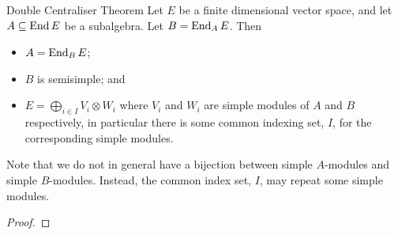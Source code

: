 \begin{thm}{Double Centraliser Theorem}{}
    Let \(E\) be a finite dimensional vector space, and let \(A \subseteq \operatorname{End} E\) be a subalgebra.
    Let \(B = \operatorname{End}_A E\).
    Then
    \begin{itemize}
        \item \(A = \operatorname{End}_B E\);
        \item \(B\) is semisimple; and
        \item \(E = \bigoplus_{i \in I} V_i \otimes W_i\) where \(V_i\) and \(W_i\) are simple modules of \(A\) and \(B\) respectively, in particular there is some common indexing set, \(I\), for the corresponding simple modules.
    \end{itemize}
    \begin{rmk}
        Note that we do not in general have a bijection between simple \(A\)-modules and simple \(B\)-modules.
        Instead, the common index set, \(I\), may repeat some simple modules.
    \end{rmk}
    \begin{proof}

\end{proof}
\end{thm}
